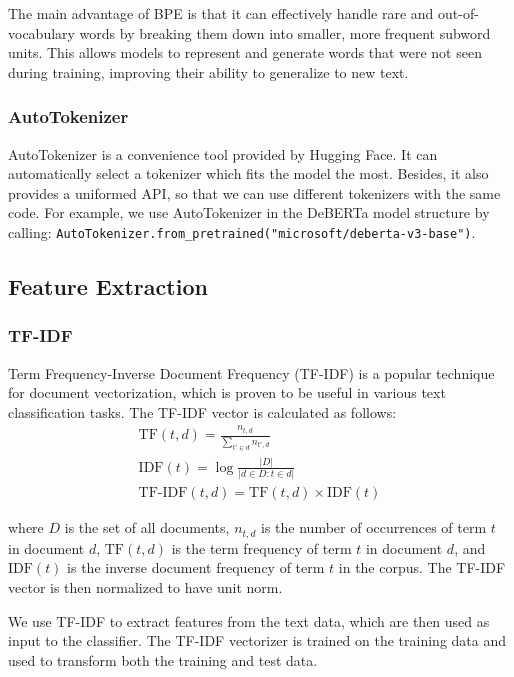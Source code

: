\documentclass[conference]{IEEEtran}
\begin{document}
The main advantage of BPE is that it can effectively handle rare and out-of-vocabulary words by breaking them down into smaller, more frequent subword units. This allows models to represent and generate words that were not seen during training, improving their ability to generalize to new text.

\subsubsection{AutoTokenizer}

AutoTokenizer is a convenience tool provided by Hugging Face. It can automatically select a tokenizer which fits the model the most. Besides, it also provides a uniformed API, so that we can use different tokenizers with the same code. For example, we use AutoTokenizer in the DeBERTa model structure by calling: \texttt{AutoTokenizer.from\linebreak\_pretrained("microsoft/deberta-v3-base")}.

\subsection{Feature Extraction}

\subsubsection{TF-IDF}

Term Frequency-Inverse Document Frequency (TF-IDF) is a popular technique for document vectorization, which is proven to be useful in various text classification tasks. The TF-IDF vector is calculated as follows:
\begin{gather}
  \text{TF}(t, d) = \frac{n_{t, d}}{\sum_{t' \in d} n_{t', d}} \\
  \text{IDF}(t) = \log \frac{|D|}{|{d \in D : t \in d}|} \\
  \text{TF-IDF}(t, d) = \text{TF}(t, d) \times \text{IDF}(t)
\end{gather}

where $D$ is the set of all documents, $n_{t, d}$ is the number of occurrences of term $t$ in document $d$, $\text{TF}(t, d)$ is the term frequency of term $t$ in document $d$, and $\text{IDF}(t)$ is the inverse document frequency of term $t$ in the corpus. The TF-IDF vector is then normalized to have unit norm.

We use TF-IDF to extract features from the text data, which are then used as input to the classifier. The TF-IDF vectorizer is trained on the training data and used to transform both the training and test data.
\end{document}
